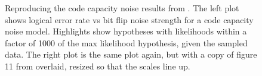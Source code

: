 \documentclass[onecolumn,unpublished,a4paper]{quantumarticle}
\theoremstyle{definition}
\theoremstyle{definition}
\theoremstyle{definition}
\begin{document}
\begin{figure}
    \centering
    \hfill
    \caption{
        Reproducing the code capacity noise results from \cite{sahay2022mobiusdecoder}.
        The left plot shows logical error rate vs bit flip noise strength for a code capacity noise model.
        Highlights show hypotheses with likelihoods within a factor of 1000 of the max likelihood hypothesis, given the sampled data.
        The right plot is the same plot again, but with a copy of figure 11 from \cite{sahay2022mobiusdecoder} overlaid, resized so that the scales line up.
    }
    \label{fig:reproduce}
\end{figure}
\end{document}
